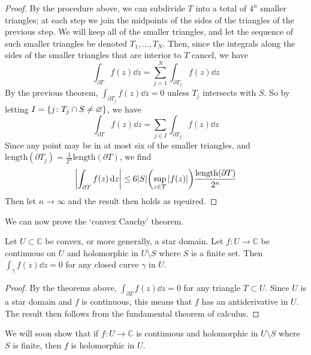 \begin{proof}
	By the procedure above, we can subdivide \( T \) into a total of \( 4^n \) smaller triangles; at each step we join the midpoints of the sides of the triangles of the previous step.
	We will keep all of the smaller triangles, and let the sequence of such smaller triangles be denoted \( T_1, \dots, T_N \).
	Then, since the integrals along the sides of the smaller triangles that are interior to \( T \) cancel, we have
	\[
		\int_{\partial T} f(z) \dd{z} = \sum_{j=1}^N \int_{\partial T_j} f(z) \dd{z}
	\]
	By the previous theorem, \( \int_{\partial T_j} f(z) \dd{z} = 0 \) unless \( T_j \) intersects with \( S \).
	So by letting \( I = \qty{j \colon T_j \cap S \neq \varnothing} \), we have
	\[
		\int_{\partial T} f(z) \dd{z} = \sum_{j \in I} \int_{\partial T_j} f(z) \dd{z}
	\]
	Since any point may be in at most six of the smaller triangles, and \( \mathrm{length}(\partial T_j) = \frac{1}{2^n} \mathrm{length}(\partial T) \), we find
	\[
		\abs{\int_{\partial T} f(z) \dd{z}} \leq 6\abs{S} \qty(\sup_{z \in T} \abs{f(z)}) \frac{\mathrm{length}(\partial T)}{2^n}
	\]
	Then let \( n \to \infty \) and the result then holds as rqeuired.
\end{proof}
We can now prove the `convex Cauchy' theorem.
\begin{corollary}
	Let \( U \subset \mathbb C \) be convex, or more generally, a star domain.
	Let \( f \colon U \to \mathbb C \) be continuous on \( U \) and holomorphic in \( U \setminus S \) where \( S \) is a finite set.
	Then \( \int_\gamma f(z) \dd{z} = 0 \) for any closed curve \( \gamma \) in \( U \).
\end{corollary}
\begin{proof}
	By the theorems above, \( \int_{\partial T} f(z) \dd{z} = 0 \) for any triangle \( T \subset U \).
	Since \( U \) is a star domain and \( f \) is continuous, this means that \( f \) has an antiderivative in \( U \).
	The result then follows from the fundamental theorem of calculus.
\end{proof}
\begin{remark}
	We will soon show that if \( f \colon U \to \mathbb C \) is continuous and holomorphic in \( U \setminus S \) where \( S \) is finite, then \( f \) is holomorphic in \( U \).
\end{remark}

